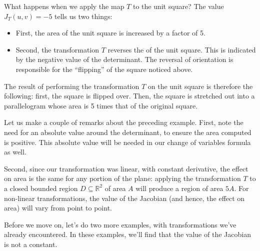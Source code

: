 {What happens when we apply the map $T$ to the unit square? The value $J_T(u,v)=-5$ tells us two things:

\begin{itemize}
\item First, the area of the unit square is increased by a factor of 5.
\item Second, the transformation $T$ reverses the  of the unit square. This is indicated by the negative value of the determinant. The reversal of orientation is responsible for the ``flipping'' of the square noticed above.
\end{itemize} 
The result of performing the transformation $T$ on the unit square is therefore the following: first, the square is flipped over. Then, the square is stretched out into a parallelogram whose area is 5 times that of the original square.

}

Let us make a couple of remarks about the preceding example. First, note the need for an absolute value around the determinant, to ensure the area computed is positive. This absolute value will be needed in our change of variables formula as well.


Second, since our transformation was linear, with constant derivative, the effect on area is the same for any portion of the plane: applying the transformation $T$ to a closed bounded region $D\subseteq \mathbb{R}^2$ of area $A$ will produce a region of area $5A$. For non-linear transformations, the value of the Jacobian (and hence, the effect on area) will vary from point to point.

Before we move on, let's do two more examples, with transformations we've already encountered. In these examples, we'll find that the value of the Jacobian is not a constant.\\

